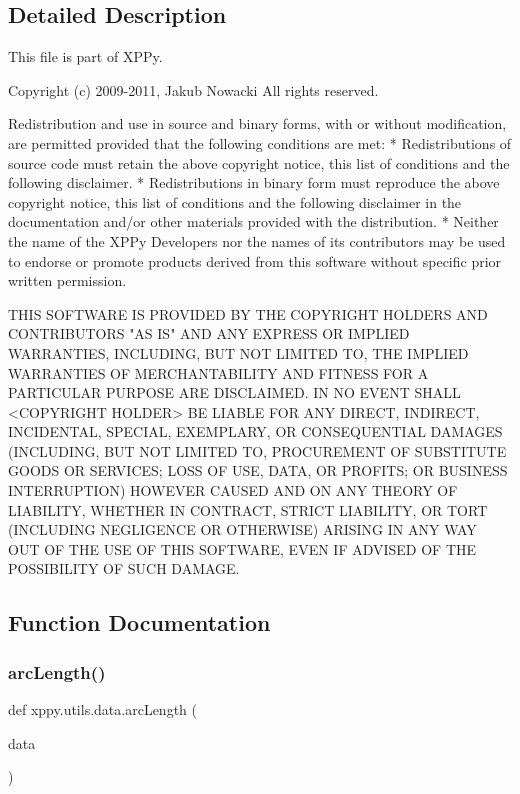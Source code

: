 \subsection{Detailed Description}
\begin{DoxyVerb}This file is part of XPPy.

Copyright (c) 2009-2011, Jakub Nowacki
All rights reserved.

Redistribution and use in source and binary forms, with or without
modification, are permitted provided that the following conditions are met:
    * Redistributions of source code must retain the above copyright
      notice, this list of conditions and the following disclaimer.
    * Redistributions in binary form must reproduce the above copyright
      notice, this list of conditions and the following disclaimer in the
      documentation and/or other materials provided with the distribution.
    * Neither the name of the XPPy Developers nor the
      names of its contributors may be used to endorse or promote products
      derived from this software without specific prior written permission.

THIS SOFTWARE IS PROVIDED BY THE COPYRIGHT HOLDERS AND CONTRIBUTORS "AS IS" AND
ANY EXPRESS OR IMPLIED WARRANTIES, INCLUDING, BUT NOT LIMITED TO, THE IMPLIED
WARRANTIES OF MERCHANTABILITY AND FITNESS FOR A PARTICULAR PURPOSE ARE
DISCLAIMED. IN NO EVENT SHALL <COPYRIGHT HOLDER> BE LIABLE FOR ANY
DIRECT, INDIRECT, INCIDENTAL, SPECIAL, EXEMPLARY, OR CONSEQUENTIAL DAMAGES
(INCLUDING, BUT NOT LIMITED TO, PROCUREMENT OF SUBSTITUTE GOODS OR SERVICES;
LOSS OF USE, DATA, OR PROFITS; OR BUSINESS INTERRUPTION) HOWEVER CAUSED AND
ON ANY THEORY OF LIABILITY, WHETHER IN CONTRACT, STRICT LIABILITY, OR TORT
(INCLUDING NEGLIGENCE OR OTHERWISE) ARISING IN ANY WAY OUT OF THE USE OF THIS
SOFTWARE, EVEN IF ADVISED OF THE POSSIBILITY OF SUCH DAMAGE.
\end{DoxyVerb}
 

\subsection{Function Documentation}
\mbox{\label{namespacexppy_1_1utils_1_1data_a380d774ab7acaada36d1e3885dff4def}} 
\subsubsection{\texorpdfstring{arc\+Length()}{arcLength()}}
{\footnotesize\ttfamily def xppy.\+utils.\+data.\+arc\+Length (\begin{DoxyParamCaption}\item[{}]{data }\end{DoxyParamCaption})}

